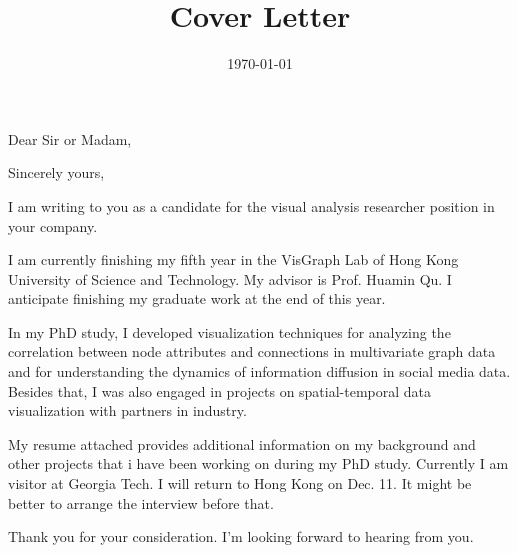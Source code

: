 \documentclass[11pt,a4paper,sans]{moderncv} %
\title{Cover Letter}
\begin{document}
\date{\today} %
\opening{Dear Sir or Madam,} %
\closing{Sincerely yours,} %
\makelettertitle %


I am writing to you as a candidate for the visual analysis researcher position in your company.

I am currently finishing my fifth year in the VisGraph Lab of Hong Kong University of Science and Technology. My advisor is Prof. Huamin Qu. I anticipate finishing my graduate work at the end of this year. 

In my PhD study, I developed visualization techniques for analyzing the correlation between node attributes and connections in multivariate graph data and for understanding the dynamics of information diffusion in social media data. Besides that, I was also engaged in projects on spatial-temporal data visualization with partners in industry.


My resume attached provides additional information on my background and other projects that i have been working on during my PhD study. Currently I am visitor at Georgia Tech. I will return to Hong Kong on Dec. 11. It might be better to arrange the interview before that. 

Thank you for your consideration. I'm looking forward to hearing from you.



\makeletterclosing %

\end{document}
